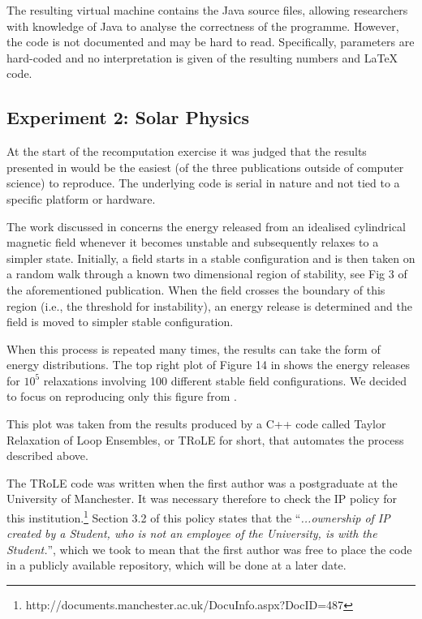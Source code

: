 The resulting virtual machine contains the Java source files, allowing researchers with knowledge of Java to analyse the correctness of the programme. However, the code is not documented and may be hard to read. Specifically, parameters are hard-coded and no interpretation is given of the resulting numbers and LaTeX code.

\subsection*{Experiment 2: Solar Physics}

At the start of the recomputation exercise it was judged that the results presented in \cite{bareford2010nanoflare}
would be the easiest (of the three publications outside of computer science) to reproduce. The underlying
code is serial in nature and not tied to a specific platform or hardware. 

The work discussed in \cite{bareford2010nanoflare} concerns the energy released from an idealised cylindrical magnetic
field whenever it becomes unstable and subsequently relaxes to a simpler state. Initially, a field starts in a
stable configuration and is then taken on a random walk through a known two dimensional region of stability, see Fig 3 of
the aforementioned publication. When the field crosses the boundary of this region (i.e., the threshold for instability),
an energy release is determined and the field is moved to simpler stable configuration. 

When this process is repeated many times, the results can take the form of energy distributions. The top right plot
of Figure 14 in \cite{bareford2010nanoflare} shows the energy releases for $10^5$ relaxations involving 100 different stable field
configurations. We decided to focus on reproducing only this figure from \cite{bareford2010nanoflare}.

This plot was taken from the results produced by a C++ code called Taylor Relaxation of Loop Ensembles, or TRoLE
for short, that automates the process described above.

The TRoLE code was written when the first author was a postgraduate at the University of Manchester. It was
necessary therefore to check the IP policy for this institution.\footnote{http://documents.manchester.ac.uk/DocuInfo.aspx?DocID=487} Section 3.2 of this policy states that the ``\emph{...ownership
of IP created by a Student, who is not an employee of the University, is with the Student.}'', which we took to mean
that the first author was free to place the code in a publicly available repository, which will be done at a later date.

